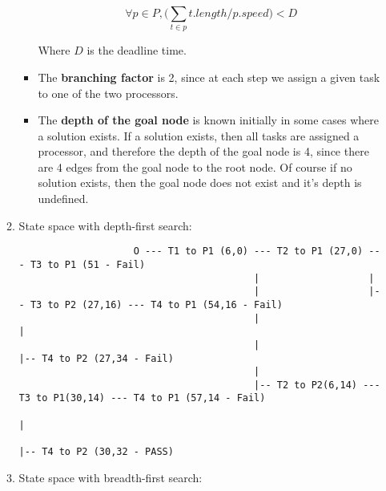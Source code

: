 \documentclass{article}
\begin{document}
\begin{enumerate}
\begin{enumerate}
\begin{itemize}
					$$\forall p \in P, \bigg(\sum_{t \in p}t.length/p.speed\bigg) < D$$
					
					Where $D$ is the deadline time.
					
					\item The \textbf{branching factor} is 2, since at each step we assign a given task to one of the two processors.
					
					\item The \textbf{depth of the goal node} is known initially in some cases where a solution exists.  If a solution exists, then all tasks are assigned a processor, and therefore the depth of the goal node is 4, since there are 4 edges from the goal node to the root node.  Of course if no solution exists, then the goal node does not exist and it's depth is undefined.
				\end{itemize}
			
				\item State space with depth-first search:
				
				\begin{verbatim}
					O --- T1 to P1 (6,0) --- T2 to P1 (27,0) --- T3 to P1 (51 - Fail)
					                     |                   |
					                     |                   |-- T3 to P2 (27,16) --- T4 to P1 (54,16 - Fail)
					                     |                                        |
					                     |                                        |-- T4 to P2 (27,34 - Fail)
					                     |
					                     |-- T2 to P2(6,14) --- T3 to P1(30,14) --- T4 to P1 (57,14 - Fail)
					                                                            |
					                                                            |-- T4 to P2 (30,32 - PASS)
				\end{verbatim}
				
				\pagebreak
				
				\item State space with breadth-first search:
				

\end{enumerate}
\end{enumerate}
\end{document}
